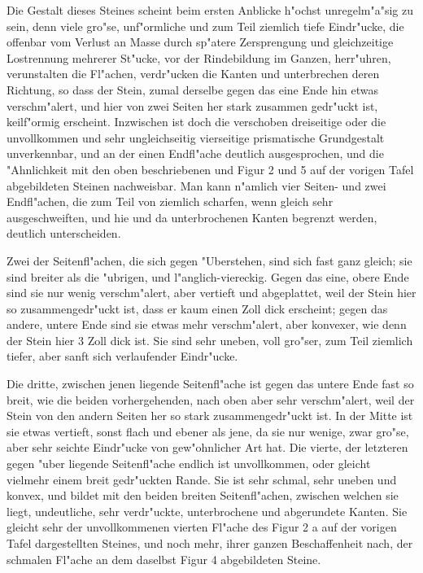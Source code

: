 \documentclass[a4paper, 11pt, oneside, german]{article}
\begin{document}
Die Gestalt dieses Steines scheint beim ersten Anblicke h"ochst unregelm"a"sig zu sein, denn viele gro"se, unf"ormliche und zum Teil ziemlich tiefe Eindr"ucke, die offenbar vom Verlust an Masse durch sp"atere Zersprengung und gleichzeitige Lostrennung mehrerer St"ucke, vor der Rindebildung im Ganzen, herr"uhren, verunstalten die Fl"achen, verdr"ucken die Kanten und unterbrechen deren Richtung, so dass der Stein, zumal derselbe gegen das eine Ende hin etwas verschm"alert, und hier von zwei Seiten her stark zusammen gedr"uckt ist, keilf"ormig erscheint. Inzwischen ist doch die verschoben dreiseitige oder die unvollkommen und sehr ungleichseitig vierseitige prismatische Grundgestalt unverkennbar, und an der einen Endfl"ache deutlich ausgesprochen, und die "Ahnlichkeit mit den oben beschriebenen und Figur 2 und 5 auf der vorigen Tafel abgebildeten Steinen nachweisbar. Man kann n"amlich vier Seiten- und zwei Endfl"achen, die zum Teil von ziemlich scharfen, wenn gleich sehr ausgeschweiften, und hie und da unterbrochenen Kanten begrenzt werden, deutlich unterscheiden.

Zwei der Seitenfl"achen, die sich gegen "Uberstehen, sind sich fast ganz gleich; sie sind breiter als die "ubrigen, und l"anglich-viereckig. Gegen das eine, obere Ende sind sie nur wenig verschm"alert, aber vertieft und abgeplattet, weil der Stein hier so zusammengedr"uckt ist, dass er kaum einen Zoll dick erscheint; gegen das andere, untere Ende sind sie etwas mehr verschm"alert, aber konvexer, wie denn der Stein hier 3 Zoll dick ist. Sie sind sehr uneben, voll gro"ser, zum Teil ziemlich tiefer, aber sanft sich verlaufender Eindr"ucke.

Die dritte, zwischen jenen liegende Seitenfl"ache ist gegen das untere Ende fast so breit, wie die beiden vorhergehenden, nach oben aber sehr verschm"alert, weil der Stein von den andern Seiten her so stark zusammengedr"uckt ist. In der Mitte ist sie etwas vertieft, sonst flach und ebener als jene, da sie nur wenige, zwar gro"se, aber sehr seichte Eindr"ucke von gew"ohnlicher Art hat. Die vierte, der letzteren gegen "uber liegende Seitenfl"ache endlich ist unvollkommen, oder gleicht vielmehr einem breit gedr"uckten Rande. Sie ist sehr schmal, sehr uneben und konvex, und bildet mit den beiden breiten Seitenfl"achen, zwischen welchen sie liegt, undeutliche, sehr verdr"uckte, unterbrochene und abgerundete Kanten. Sie gleicht sehr der unvollkommenen vierten Fl"ache des Figur 2 a auf der vorigen Tafel dargestellten Steines, und noch mehr, ihrer ganzen Beschaffenheit nach, der schmalen Fl"ache an dem daselbst Figur 4 abgebildeten Steine.
\end{document}
